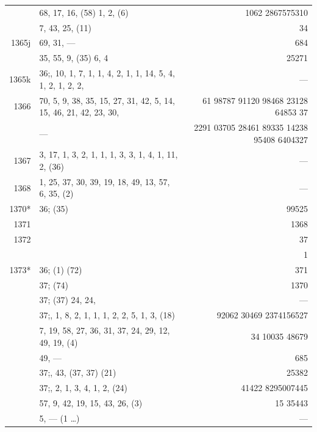 \documentclass[11pt]{article}
\begin{document}
{\begin{longtable}{|r|p{8.5cm}|r|}
       & 68, 17, 16, (58) 1, 2, (6) & 1062 2867575310 \\
       & 7, 43, 25, (11) & 34 \\
\hline
1365j  & 69, 31, --- & 684 \\
       & 35, 55, 9, (35) 6, 4 & 25271 \\
\hline
1365k  & $36$;\; 4, 10, 1, 7, 1, 1, 4, 2, 1, 1, 14, 5, 4, 1, 2, 1, 2, 2, & --- \\
1366   & 70, 5, 9, 38, 35, 15, 27, 31, 42, 5, 14, 15, 46, 21, 42, 23, 30, & 61 98787 91120 98468 23128 64853 37 \\
       & --- & 2291 03705 28461 89335 14238 95408 6404327 \\
\hline
1367   & 3, 17, 1, 3, 2, 1, 1, 1, 3, 3, 1, 4, 1, 11, 2, (36) & --- \\
1368   & 1, 25, 37, 30, 39, 19, 18, 49, 13, 57, 6, 35, (2) & --- \\
\hline
1370*  & $36$;\; (35) & 99525 \\
1371   & & 1368 \\
1372   & & 37 \\
       & & 1 \\
\hline
1373*  & $36$;\; (1) (72) & 371 \\
\hline
       & $37$;\; (74) & 1370 \\
\hline
       & $37$;\; (37) 24, 24, & --- \\
\hline
       & $37$;\; 1, 1, 8, 2, 1, 1, 1, 2, 2, 5, 1, 3, (18) & 92062 30469 2374156527 \\
       & 7, 19, 58, 27, 36, 31, 37, 24, 29, 12, 49, 19, (4) & 34 10035 48679 \\
       & 49, --- & 685 \\
\hline
       & $37$;\; 14, 43, (37, 37) (21) & 25382 \\
\hline
       & $37$;\; 4, 2, 1, 3, 4, 1, 2, (24) & 41422 8295007445 \\
       & 57, 9, 42, 19, 15, 43, 26, (3) & 15 35443 \\
       & 5, --- (1 \dots) & --- \\
\hline
\end{longtable}
}
\end{document}
